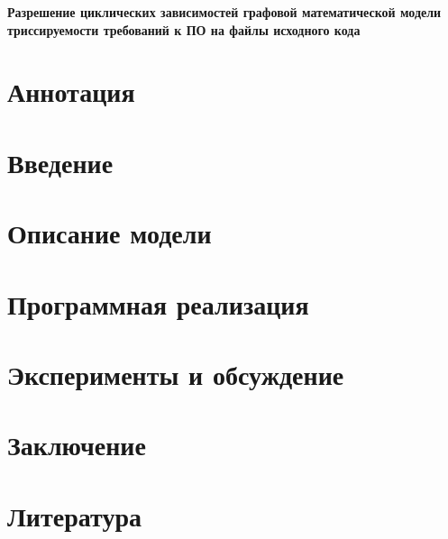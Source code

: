 \documentclass{article}
\begin{document}
    \begin{center}
    \Large
    \textbf{Разрешение циклических зависимостей графовой математической модели триссируемости требований к ПО на файлы исходного кода}
    \end{center}

    \section*{Аннотация}
    

    \section*{Введение}
    

    \section*{Описание модели}
    

    \section*{Программная реализация}
    

    \section*{Эксперименты и обсуждение}
    

    \section*{Заключение}
    

    \section*{Литература}
    
\end{document}
